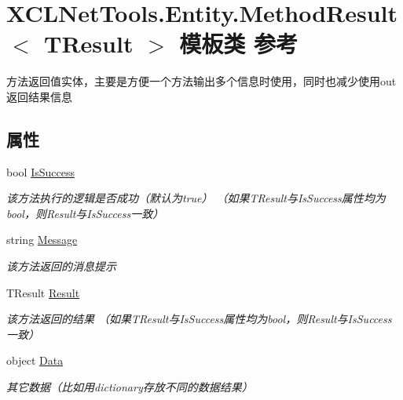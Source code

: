 \hypertarget{class_x_c_l_net_tools_1_1_entity_1_1_method_result_3_01_t_result_01_4}{\section{X\-C\-L\-Net\-Tools.\-Entity.\-Method\-Result$<$ T\-Result $>$ 模板类 参考}
\label{class_x_c_l_net_tools_1_1_entity_1_1_method_result_3_01_t_result_01_4}
}


方法返回值实体，主要是方便一个方法输出多个信息时使用，同时也减少使用out返回结果信息  


\subsection*{属性}
\begin{DoxyCompactItemize}
\item 
bool \hyperlink{class_x_c_l_net_tools_1_1_entity_1_1_method_result_3_01_t_result_01_4_a23c741c9a35f609e2bb5b8842911a48e}{Is\-Success}
\begin{DoxyCompactList}\small\item\em 该方法执行的逻辑是否成功（默认为true） （如果\-T\-Result与\-Is\-Success属性均为bool，则\-Result与\-Is\-Success一致） \end{DoxyCompactList}\item 
string \hyperlink{class_x_c_l_net_tools_1_1_entity_1_1_method_result_3_01_t_result_01_4_a475362b3bdd578fb2b98befa28355b2b}{Message}
\begin{DoxyCompactList}\small\item\em 该方法返回的消息提示 \end{DoxyCompactList}\item 
T\-Result \hyperlink{class_x_c_l_net_tools_1_1_entity_1_1_method_result_3_01_t_result_01_4_aa4bccee54c4cec1d31ab291cc020f4c3}{Result}
\begin{DoxyCompactList}\small\item\em 该方法返回的结果 （如果\-T\-Result与\-Is\-Success属性均为bool，则\-Result与\-Is\-Success一致） \end{DoxyCompactList}\item 
object \hyperlink{class_x_c_l_net_tools_1_1_entity_1_1_method_result_3_01_t_result_01_4_ab97c4a1207c6a61651647dad225189b0}{Data}
\begin{DoxyCompactList}\small\item\em 其它数据（比如用dictionary存放不同的数据结果） \end{DoxyCompactList}\end{DoxyCompactItemize}


